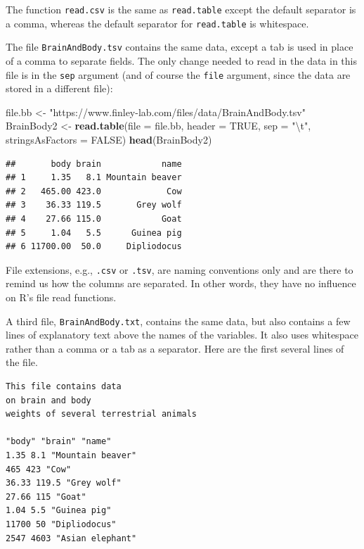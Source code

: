 \documentclass[
]{krantz}
\newenvironment{Shaded}{\begin{snugshade}}{\end{snugshade}}
\newcommand{\CharTok}[1]{\textcolor[rgb]{0.31,0.60,0.02}{#1}}
\newcommand{\DataTypeTok}[1]{\textcolor[rgb]{0.13,0.29,0.53}{#1}}
\newcommand{\KeywordTok}[1]{\textcolor[rgb]{0.13,0.29,0.53}{\textbf{#1}}}
\newcommand{\NormalTok}[1]{#1}
\newcommand{\OtherTok}[1]{\textcolor[rgb]{0.56,0.35,0.01}{#1}}
\newcommand{\StringTok}[1]{\textcolor[rgb]{0.31,0.60,0.02}{#1}}
\begin{document}
The function \texttt{read.csv} is the same as \texttt{read.table} except the default separator is a comma, whereas the default separator for \texttt{read.table} is whitespace.

The file \texttt{BrainAndBody.tsv} contains the same data, except a tab is used in place of a comma to separate fields. The only change needed to read in the data in this file is in the \texttt{sep} argument (and of course the \texttt{file} argument, since the data are stored in a different file):

\begin{Shaded}
\begin{Highlighting}[]
\NormalTok{file.bb \textless{}{-}}\StringTok{ "https://www.finley{-}lab.com/files/data/BrainAndBody.tsv"}
\NormalTok{BrainBody2 \textless{}{-}}\StringTok{ }\KeywordTok{read.table}\NormalTok{(}\DataTypeTok{file =}\NormalTok{ file.bb, }\DataTypeTok{header =} \OtherTok{TRUE}\NormalTok{, }\DataTypeTok{sep =} \StringTok{"}\CharTok{\textbackslash{}t}\StringTok{"}\NormalTok{, }
                         \DataTypeTok{stringsAsFactors =} \OtherTok{FALSE}\NormalTok{)}
\KeywordTok{head}\NormalTok{(BrainBody2)}
\end{Highlighting}
\end{Shaded}

\begin{verbatim}
##       body brain            name
## 1     1.35   8.1 Mountain beaver
## 2   465.00 423.0             Cow
## 3    36.33 119.5       Grey wolf
## 4    27.66 115.0            Goat
## 5     1.04   5.5      Guinea pig
## 6 11700.00  50.0     Dipliodocus
\end{verbatim}

File extensions, e.g., \texttt{.csv} or \texttt{.tsv}, are naming conventions only and are there to remind us how the columns are separated. In other words, they have no influence on R's file read functions.

A third file, \texttt{BrainAndBody.txt}, contains the same data, but also contains a few lines of explanatory text above the names of the variables. It also uses whitespace rather than a comma or a tab as a separator. Here are the first several lines of the file.

\begin{verbatim}
This file contains data
on brain and body
weights of several terrestrial animals

"body" "brain" "name"
1.35 8.1 "Mountain beaver"
465 423 "Cow"
36.33 119.5 "Grey wolf"
27.66 115 "Goat"
1.04 5.5 "Guinea pig"
11700 50 "Dipliodocus"
2547 4603 "Asian elephant"
\end{verbatim}
\end{document}

